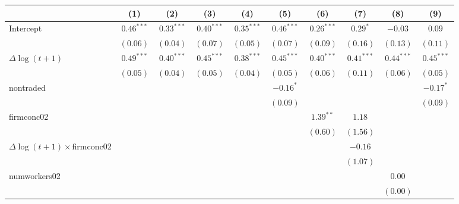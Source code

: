 
\begin{tabular}{l c c c c c c c c c }
\hline
 & (1) & (2) & (3) & (4) & (5) & (6) & (7) & (8) & (9) \\
\hline
Intercept            & $0.46^{***}$ & $0.33^{***}$ & $0.40^{***}$ & $0.35^{***}$ & $0.46^{***}$ & $0.26^{***}$ & $0.29^{*}$   & $-0.03$      & $0.09$        \\
                     & $(0.06)$     & $(0.04)$     & $(0.07)$     & $(0.05)$     & $(0.07)$     & $(0.09)$     & $(0.16)$     & $(0.13)$     & $(0.11)$      \\
$\Delta\log(t+1)$    & $0.49^{***}$ & $0.40^{***}$ & $0.45^{***}$ & $0.38^{***}$ & $0.45^{***}$ & $0.40^{***}$ & $0.41^{***}$ & $0.44^{***}$ & $0.45^{***}$  \\
                     & $(0.05)$     & $(0.04)$     & $(0.05)$     & $(0.04)$     & $(0.05)$     & $(0.06)$     & $(0.11)$     & $(0.06)$     & $(0.05)$      \\
nontraded            &              &              &              &              & $-0.16^{*}$  &              &              &              & $-0.17^{*}$   \\
                     &              &              &              &              & $(0.09)$     &              &              &              & $(0.09)$      \\
firmconc02           &              &              &              &              &              & $1.39^{**}$  & $1.18$       &              &               \\
                     &              &              &              &              &              & $(0.60)$     & $(1.56)$     &              &               \\
$\Delta\log(t+1)\times$firmconc02    &              &              &              &              &              &              & $-0.16$      &              &               \\
                     &              &              &              &              &              &              & $(1.07)$     &              &               \\
numworkers02         &              &              &              &              &              &              &              & $0.00$       &               \\
                     &              &              &              &              &              &              &              & $(0.00)$     &               \\

\end{tabular}
